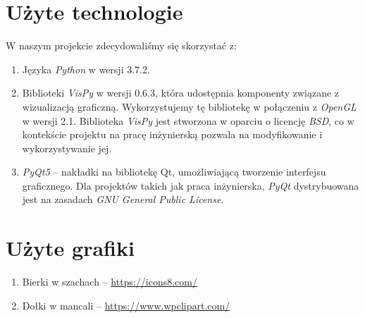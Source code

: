 \documentclass{article}
\let\oldsection\section
\renewcommand\section{\clearpage\oldsection}
\newcommand{\modulename}[1]{\textit{#1}}
\begin{document}
\section{Użyte technologie}
W naszym projekcie zdecydowaliśmy się skorzystać z:
\begin{enumerate}
	\item Języka \modulename{Python} w wersji 3.7.2.
	\item Biblioteki \modulename{VisPy} w wersji 0.6.3, która udostępnia komponenty związane z wizualizacją graficzną. Wykorzystujemy tę bibliotekę w połączeniu z \modulename{OpenGL} w wersji 2.1. Biblioteka \modulename{VisPy} jest stworzona w oparciu o licencję \modulename{BSD}, co w kontekście projektu na pracę inżynierską pozwala na modyfikowanie i wykorzystywanie jej.
	\item \modulename{PyQt5} – nakładki na bibliotekę Qt, umożliwiającą tworzenie interfejsu graficznego. Dla projektów takich jak praca inżynierska, \modulename{PyQt} dystrybuowana jest na zasadach \modulename{GNU General Public License}.
\end{enumerate}


\section{Użyte grafiki}
\begin{enumerate}
	\item Bierki w szachach – \url{https://icons8.com/}
	\item Dołki w mancali – \url{https://www.wpclipart.com/}
\end{enumerate}
\end{document}
